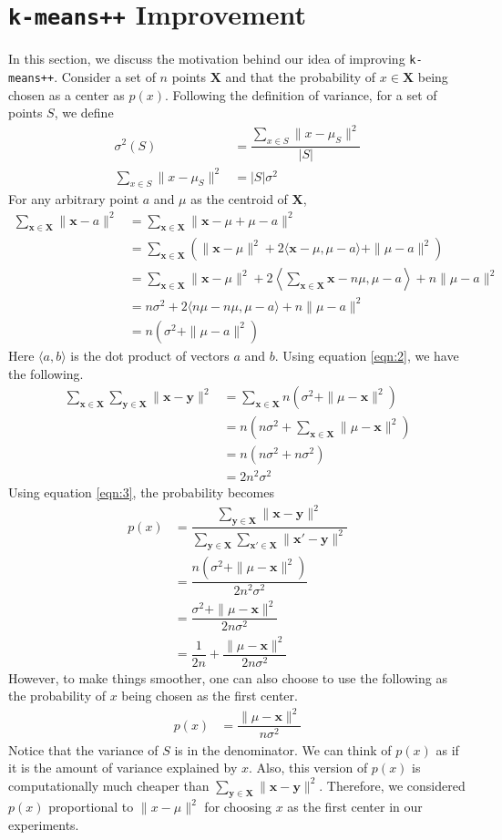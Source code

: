 \documentclass[twoside, 11pt]{article}
\newcommand{\x}{\mathbf{x}}
\newcommand{\X}{\mathbf{X}}
\newcommand{\y}{\mathbf{y}}
\begin{document}
	\section{\texttt{k-means++} Improvement}\label{sec:motivation}
	In this section, we discuss the motivation behind our idea of improving \texttt{k-means++}. 
	Consider a set of $n$ points $\X$ and that the probability of $x\in\X$ being chosen as a center as $p(x)$. Following the definition of variance, for a set of points $S$, we define
		\begin{align}
			\sigma^2(S) & = \dfrac{\sum_{x\in S} \|x-\mu_{S}\|^2}{|S|}\nonumber\\
			\sum_{x\in S}\|x-\mu_{S}\|^2 & = |S|\sigma^2\label{eqn:1}
		\end{align}
	For any arbitrary point $a$ and $\mu$ as the centroid of $\X$,
		\begin{align}
			\sum_{\x\in\X}\|\x-a\|^2
				  & = \sum_{\x\in\X}\|\x-\mu+\mu-a\|^2\nonumber\\
				  & = \sum_{\x\in\X}\left(\|\x-\mu\|^2+2\langle\x-\mu,\mu-a\rangle+\|\mu-a\|^2\right)\nonumber\\
				  & = \sum_{\x\in\X}\|\x-\mu\|^2+2\left\langle\sum_{\x\in\X}\x-n\mu,\mu-a\right\rangle+n\|\mu-a\|^2\nonumber\\
				  & = n\sigma^2+2\langle n\mu-n\mu,\mu-a\rangle+n\|\mu-a\|^2\nonumber\\
				  & = n(\sigma^2+\|\mu-a\|^2)\label{eqn:2}
		\end{align}
	Here $\langle a,b\rangle$ is the dot product of vectors $a$ and $b$. Using equation \eqref{eqn:2}, we have the following.
		\begin{align}
			\sum_{\x\in\X}\sum_{\y\in\X}\|\x-\y\|^2 
				& = \sum_{\x\in\X}n(\sigma^2+\|\mu-\x\|^2)\nonumber\\
				& = n(n\sigma^2+\sum_{\x\in\X}\|\mu-\x\|^2)\nonumber\\
				& = n(n\sigma^2+n\sigma^2)\nonumber\\
				& = 2n^2\sigma^2\label{eqn:3}
		\end{align}
	Using equation \eqref{eqn:3}, the probability becomes
		\begin{align*}
			p(x) & = \dfrac{\sum_{\y\in\X}\|\x-\y\|^2}{\sum_{\y\in\X}\sum_{\x'\in\X}\|\x'-\y\|^2}\\
				 & = \dfrac{n(\sigma^2+\|\mu-\x\|^2)}{2n^2\sigma^2}\\
				 & = \dfrac{\sigma^2+\|\mu-\x\|^2}{2n\sigma^2}\\
				 & = \dfrac{1}{2n}+\dfrac{\|\mu-\x\|^2}{2n\sigma^2}
		\end{align*}
	However, to make things smoother, one can also choose to use the following as the probability of $x$ being chosen as the first center.
		\begin{align*}
			p(x) & = \dfrac{\|\mu-\x\|^2}{n\sigma^2}
		\end{align*}
	Notice that the variance of $S$ is in the denominator. We can think of $p(x)$ as if it is the amount of variance explained by $x$. Also, this version of $p(x)$ is computationally much cheaper than $\sum_{\y\in\X}\|\x-\y\|^2$. Therefore, we considered $p(x)$ proportional to $\|x-\mu\|^2$ for choosing $x$ as the first center in our experiments.
\end{document}
